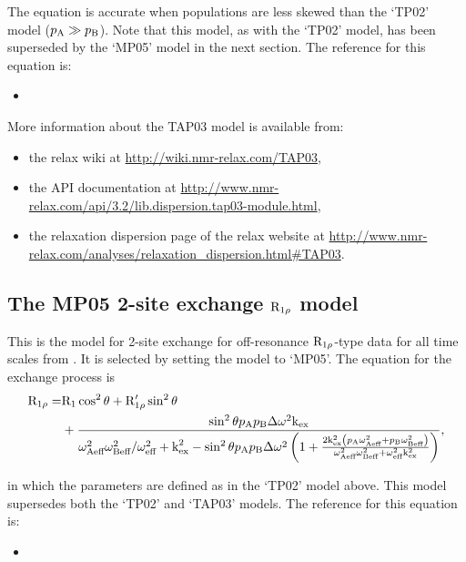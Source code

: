 The equation is accurate when populations are less skewed than the `TP02' model ($p_{\textrm{A}} \gg p_{\textrm{B}}$).
Note that this model, as with the `TP02' model, has been superseded by the `MP05' model in the next section.
The reference for this equation is:
\begin{itemize}
  \item {}
\end{itemize}

More information about the TAP03 model is available from:
\begin{itemize}
  \item the relax wiki at \url{http://wiki.nmr-relax.com/TAP03},
  \item the API documentation at \url{http://www.nmr-relax.com/api/3.2/lib.dispersion.tap03-module.html},
  \item the relaxation dispersion page of the relax website at \url{http://www.nmr-relax.com/analyses/relaxation\_dispersion.html#TAP03}.
\end{itemize}



\subsection{The MP05 2-site exchange $\mathrm{R}_{1\rho}$ model}
\label{sect: dispersion: MP05 model}

This is the model for 2-site exchange for off-resonance $\mathrm{R}_{1\rho}$-type data for all time scales from \citet{MiloushevPalmer05}.
It is selected by setting the model to `MP05'.
The equation for the exchange process is
\begin{align}
    \mathrm{R}_{1\rho} = & \mathrm{R}_1\cos^2\theta + \mathrm{R}_{1\rho}'\sin^2\theta \nonumber \\
               & + \frac{\sin^2\theta p_{\textrm{A}}p_{\textrm{B}}\Delta\omega^2\textrm{k}_{\textrm{ex}}}{\omega_\textrm{Aeff}^2\omega_\textrm{Beff}^2/\omega_\textrm{eff}^2 + \textrm{k}_{\textrm{ex}}^2 - \sin^2\theta p_{\textrm{A}}p_{\textrm{B}}\Delta\omega^2 \left(
                        1 + \frac{2\textrm{k}_{\textrm{ex}}^2 \left( p_{\textrm{A}}\omega_\textrm{Aeff}^2 + p_{\textrm{B}}\omega_\textrm{Beff}^2 \right)}{\omega_\textrm{Aeff}^2\omega_\textrm{Beff}^2 + \omega_\textrm{eff}^2\textrm{k}_{\textrm{ex}}^2}
                    \right)},
\end{align}

in which the parameters are defined as in the `TP02' model above.
This model supersedes both the `TP02' and `TAP03' models.
The reference for this equation is:
\begin{itemize}
  \item {}
\end{itemize}

